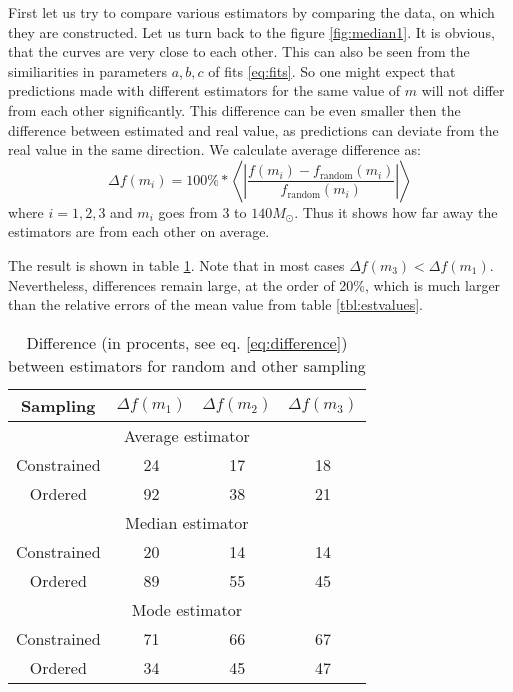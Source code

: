\documentclass{aastex}
\newcommand{\MSun}{M_\odot}
\begin{document}
First let us try to compare various estimators by comparing the data, on which they are constructed. Let us turn back to the figure \ref{fig:median1}. It is obvious, that the curves are very close to each other. This can also be seen from the similiarities in parameters $a, b, c$ of fits \ref{eq:fits}. So one might expect that predictions made with different estimators for the same value of $m$ will not differ from each other significantly. This difference can be even smaller then the difference between estimated and real value, as predictions can deviate from the real value in the same direction.
We calculate average difference as:
\begin{equation}
  \Delta f(m_i) = 100\%*\left< \left| \frac{f(m_i) - f_\mathrm{random}(m_i)}{f_\mathrm{random}(m_i)}\right| \right> \label{eq:difference}
\end{equation} 
where $i = 1,2,3$ and $m_i$ goes from $3$ to $140 \MSun$. Thus it shows how far away the estimators are from each other on average.

The result is shown in table \ref{tbl:variance}. Note that in most cases $\Delta f(m_3) < \Delta f(m_1)$. Nevertheless, differences remain large, at the order of 20\%, which is much larger than the relative errors of the mean value from table \ref{tbl:estvalues}.

\begin{table}
\begin{center}
\caption{Difference (in procents, see eq. \ref{eq:difference}) between estimators for random and other sampling} \label{tbl:variance}
\begin{tabular}{cccc} \\ \toprule
Sampling & $\Delta f(m_1)$ & $\Delta f(m_2)$ & $\Delta f(m_3)$ \\ \midrule
\multicolumn{4}{c}{Average estimator} \\ \midrule
Constrained & 24 & 17 & 18  \\ \midrule
Ordered     & 92 & 38 & 21  \\ \midrule
\multicolumn{4}{c}{Median estimator} \\ \midrule
Constrained & 20 & 14 & 14  \\ \midrule
Ordered     & 89 & 55 & 45  \\ \midrule
\multicolumn{4}{c}{Mode estimator} \\ \midrule
Constrained & 71 & 66 & 67  \\ \midrule
Ordered     & 34 & 45 & 47  \\ \bottomrule
\end{tabular}
\end{center}
\end{table}
\end{document}
